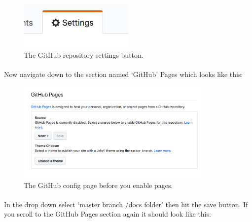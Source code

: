 \documentclass[10pt, a4paper, twosize]{article}
\begin{document}
\begin{figure}[H]
\centering
\includegraphics[width=0.5\textwidth]{images/github_settings}
\caption{The GitHub repository settings button.}
\label{fig:github_settings}
\end{figure}

\paragraph{} Now navigate down to the section named `GitHub' Pages which looks like this:

\begin{figure}[H]
\centering
\includegraphics[width=0.85\textwidth]{images/github_config_before}
\caption{The GitHub config page before you enable pages.}
\label{fig:github_config_before}
\end{figure}

\paragraph{} In the drop down select `master branch /docs folder' then hit the save button. If you scroll to the GitHub Pages section again it should look like this:
\end{document}
